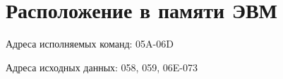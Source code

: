 \documentclass[14pt]{extreport}
\begin{document}
%
%
%


    \section{Расположение в памяти ЭВМ}

        Адреса исполняемых команд: 05A-06D

        Адреса исходных данных: 058, 059, 06E-073
\end{document}
